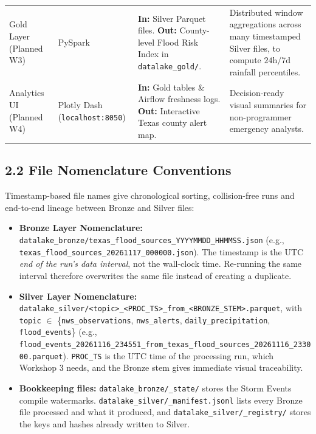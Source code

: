 \documentclass[stu, 12pt, letterpaper, donotrepeattitle, floatsintext, natbib]{apa7}
\begin{document}
\begin{table}[H]
\begin{tabularx}{\textwidth}{>{\raggedright\arraybackslash}p{2.5cm} >{\raggedright\arraybackslash}p{3.0cm} >{\raggedright\arraybackslash}p{4.0cm} >{\raggedright\arraybackslash}X}
\addlinespace
Gold Layer (Planned W3) & PySpark & \textbf{In:} Silver Parquet files. \newline \textbf{Out:} County-level Flood Risk Index in \texttt{datalake\_gold/}. & Distributed window aggregations across many timestamped Silver files, to compute $24\text{h}/7\text{d}$ rainfall percentiles. \\
\addlinespace
Analytics UI (Planned W4) & Plotly Dash (\texttt{localhost:8050}) & \textbf{In:} Gold tables \& Airflow freshness logs. \newline \textbf{Out:} Interactive Texas county alert map. & Decision-ready visual summaries for non-programmer emergency analysts. \\
\bottomrule
\end{tabularx}
\end{table}

\subsection{2.2 File Nomenclature Conventions}
Timestamp-based file names give chronological sorting, collision-free runs and end-to-end lineage between Bronze and Silver files:

\begin{itemize}
    \item \textbf{Bronze Layer Nomenclature:} \\
    \texttt{datalake\_bronze/texas\_flood\_sources\_YYYYMMDD\_HHMMSS.json} (e.g., \texttt{texas\_flood\_sources\_20261117\_000000.json}). The timestamp is the UTC \emph{end of the run's data interval}, not the wall-clock time. Re-running the same interval therefore overwrites the same file instead of creating a duplicate.
    \item \textbf{Silver Layer Nomenclature:} \\
    \texttt{datalake\_silver/<topic>\_<PROC\_TS>\_from\_<BRONZE\_STEM>.parquet}, with \texttt{topic} $\in$ \{\texttt{nws\_observations}, \texttt{nws\_alerts}, \texttt{daily\_precipitation}, \texttt{flood\_events}\} (e.g., \texttt{flood\_events\_20261116\_234551\_from\_texas\_flood\_sources\_20261116\_233000.parquet}). \texttt{PROC\_TS} is the UTC time of the processing run, which Workshop 3 needs, and the Bronze stem gives immediate visual traceability.
    \item \textbf{Bookkeeping files:} \texttt{datalake\_bronze/\_state/} stores the Storm Events compile watermarks. \texttt{datalake\_silver/\_manifest.jsonl} lists every Bronze file processed and what it produced, and \texttt{datalake\_silver/\_registry/} stores the keys and hashes already written to Silver.
\end{itemize}
\end{document}
